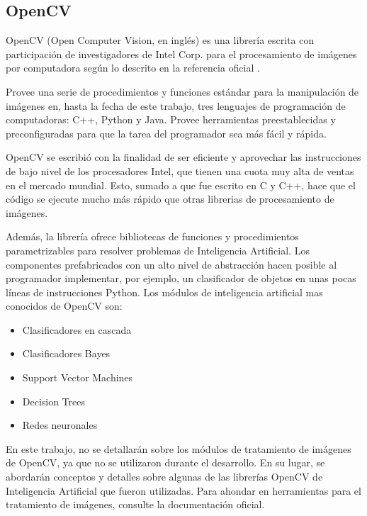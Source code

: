 \documentclass[a4paper,12pt,oneside,spanish]{book}
\begin{document}
\subsection{OpenCV}

OpenCV (Open Computer Vision, en inglés) es una librería escrita con participación de investigadores de Intel Corp. para el procesamiento de imágenes por computadora según lo descrito en la referencia oficial \cite{opencv1}. \par 
Provee una serie de procedimientos y funciones estándar para la manipulación de imágenes en, hasta la fecha de este trabajo, tres lenguajes de programación de computadoras: C++,  Python y Java. Provee herramientas preestablecidas y preconfiguradas para que la tarea del programador sea más fácil y rápida. \par

OpenCV se escribió con la finalidad de ser eficiente y aprovechar las instrucciones de bajo nivel de los procesadores Intel, que tienen una cuota muy alta de ventas en el mercado mundial. Esto, sumado a que fue escrito en C y C++, hace que el código se ejecute mucho más rápido que otras librerias de procesamiento de imágenes.\par

Además, la librería ofrece bibliotecas de funciones y procedimientos parametrizables para resolver problemas de Inteligencia Artificial. Los componentes prefabricados con un alto nivel de abstracción hacen posible al programador implementar, por ejemplo, un clasificador de objetos en unas pocas líneas de instrucciones Python. Los módulos de inteligencia artificial mas conocidos de OpenCV son:\par
\begin{itemize}
	\setlength\itemsep{-0.2em}
	\item Clasificadores en cascada	
	\item Clasificadores Bayes
	\item Support Vector Machines
	\item Decision Trees 
	\item Redes neuronales 
\end{itemize}

En este trabajo, no se detallarán sobre los módulos de tratamiento de imágenes de OpenCV, ya que no se utilizaron durante el desarrollo. En su lugar, se abordarán conceptos y detalles sobre algunas de las librerías OpenCV de Inteligencia Artificial que fueron utilizadas. Para ahondar en herramientas para el tratamiento de imágenes, consulte la documentación oficial.\par
\end{document}
